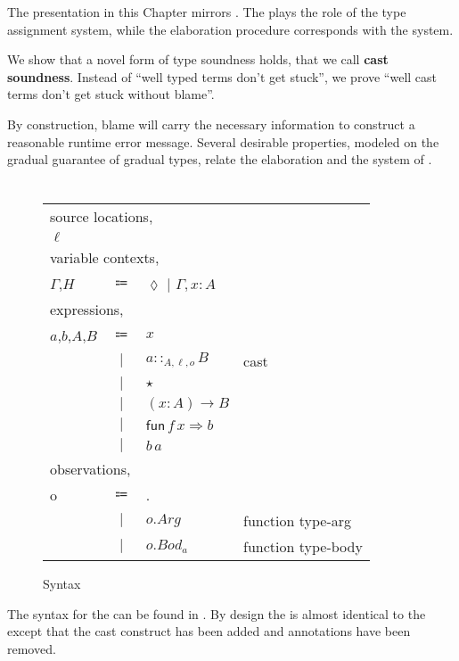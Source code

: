 The presentation in this Chapter mirrors .
The \csys{} plays the role of the type assignment system, while the elaboration procedure corresponds with the \bidir{} system.
 
We show that a novel form of type soundness holds, that we call \textbf{cast soundness}.
Instead of ``well typed terms don't get stuck'', we prove ``well cast terms don't get stuck without blame''.
 
By construction, blame will carry the necessary information to construct a reasonable runtime error message.
Several desirable properties, modeled on the gradual guarantee of gradual types, relate the \csys{} elaboration and the \bidir{} system of .

\section{\CLang{}}
 
\begin{figure}
\begin{tabular}{lcll}
\multicolumn{4}{l}{source locations,}\tabularnewline
$\ensuremath{\ell}$ &  &  & \tabularnewline
\multicolumn{4}{l}{variable contexts,}\tabularnewline
$\Gamma$,$H$ & $\Coloneqq$ & $\lozenge$ $|$ $\Gamma,x:A$ & \tabularnewline
\multicolumn{4}{l}{expressions,}\tabularnewline
$a$,$b$,$A$,$B$ & $\Coloneqq$ & $x$ & \tabularnewline
& $|$ & $a::_{A,\ensuremath{\ell},o}B$ & cast\tabularnewline
& $|$ & $\star$ & \tabularnewline
& $|$ & $\left(x:A\right)\rightarrow B$ & \tabularnewline
& $|$ & $\mathsf{fun}\,f\,x\Rightarrow b$ & \tabularnewline
& $|$ & $b\,a$ & \tabularnewline
\multicolumn{4}{l}{observations,}\tabularnewline
o & $\Coloneqq$ & . & \tabularnewline
& $|$ & $o.Arg$ & function type-arg\tabularnewline
& $|$ & $o.Bod_a$ & function type-body\tabularnewline
\end{tabular}


\caption{\CLang{} Syntax}
\label{fig:cast-pre-syntax}
\end{figure}

The syntax for the \clang{} can be found in .
By design the \clang{} is almost identical to the \slang{} except that the cast construct has been added and annotations have been removed.

